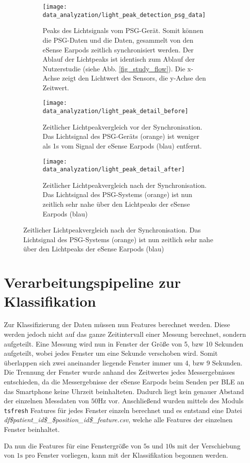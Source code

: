 \begin{figure}[ht]
  \centering
  \begin{subfigure}{0.66\textwidth}
    \texttt{[image: data\_analyzation/light\_peak\_detection\_psg\_data]}
    \caption{Peaks des Lichtsignals vom PSG-Gerät. Somit können die PSG-Daten und die Daten, gesammelt von den eSense Earpods zeitlich synchronisiert werden. Der Ablauf der Lichtpeaks ist identisch zum Ablauf der Nutzerstudie (siehe Abb. \ref{fig_study_flow}). Die x-Achse zeigt den Lichtwert des Sensors, die y-Achse den Zeitwert.}
  \end{subfigure}
  \begin{subfigure}{.49\textwidth}
    \texttt{[image: data\_analyzation/light\_peak\_detail\_before]}
    \caption{Zeitlicher Lichtpeakvergleich vor der Synchronisation. Das Lichtsignal des PSG-Geräts (orange) ist weniger als 1s vom Signal der eSense Earpods (blau) entfernt.}
    \label{implementation:synchronisation:before_light_peak}
  \end{subfigure}
  \begin{subfigure}{.49\textwidth}
    \texttt{[image: data\_analyzation/light\_peak\_detail\_after]}
    \caption{Zeitlicher Lichtpeakvergleich nach der Synchronisation. Das Lichtsignal des PSG-Systems (orange) ist nun zeitlich sehr nahe über den Lichtpeaks der eSense Earpods (blau)}
    \label{implementation:synchronisation:after_light_peak}
  \end{subfigure}
  \label{implementation:synchronisation}
\end{figure}

\section{Verarbeitungspipeline zur Klassifikation}
\label{ch:Implementierung:classification_pipeline}
Zur Klassifizierung der Daten müssen nun Features berechnet werden. 
Diese werden jedoch nicht auf das ganze Zeitintervall einer Messung berechnet, sondern aufgeteilt.
Eine Messung wird nun in Fenster der Größe von 5, bzw 10 Sekunden aufgeteilt, wobei jedes Fenster um eine Sekunde verschoben wird. 
Somit überlappen sich zwei aneinander liegende Fenster immer um 4, bzw 9 Sekunden. 
Die Trennung der Fenster wurde anhand des Zeitwertes jedes Messergebnisses entschieden, da die Messergebnisse der eSense Earpods beim Senden per BLE an das Smartphone keine Uhrzeit beinhalteten.
Dadurch liegt kein genauer Abstand der einzelnen Messdaten von $50\si{\hertz}$ vor. 
Anschließend wurden mittels des Moduls \texttt{tsfresh} Features für jedes Fenster einzeln berechnet und es entstand eine Datei \textit{df\$patient\_id\$\_\$position\_id\$\_feature.csv}, welche alle Features der einzelnen Fenster beinhaltet.

Da nun die Features für eine Fenstergröße von $5\si{\s}$ und $10\si{\s}$ mit der Verschiebung von $1\si{\s}$ pro Fenster vorliegen, kann mit der Klassifikation begonnen werden.